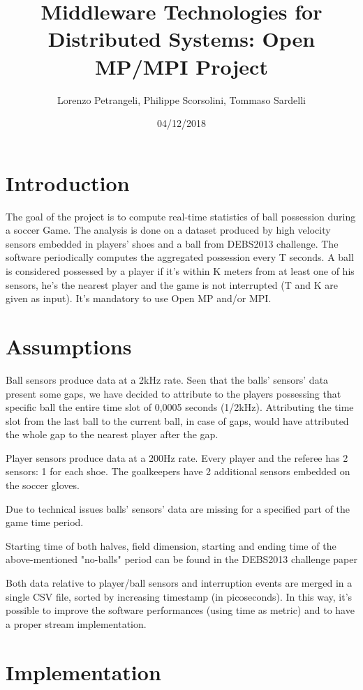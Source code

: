 \documentclass[a4paper]{article}
\title{Middleware Technologies for Distributed Systems: Open MP/MPI Project}
\author{Lorenzo Petrangeli, Philippe Scorsolini, Tommaso Sardelli}
\date{04/12/2018}
\begin{document}
\maketitle

\section{Introduction}

The goal of the project is to compute real-time statistics of ball possession during a soccer Game. The analysis is done on a dataset produced by high velocity sensors embedded in players' shoes and a ball from DEBS2013 challenge\cite{bardi2006calculus}. The software periodically computes the aggregated possession every T seconds. A ball is considered possessed by a player if it's within K meters from at least one of his sensors, he's the nearest player and the game is not interrupted (T and K are given as input). It's mandatory to use Open MP and/or MPI.

\section{Assumptions}

Ball sensors produce data at a 2kHz rate. Seen that the balls' sensors' data present some gaps, we have decided to attribute to the players possessing that specific ball the entire time slot of 0,0005 seconds (1/2kHz). Attributing the time slot from the last ball to the current ball, in case of gaps, would have attributed the whole gap to the nearest player after the gap. 

Player sensors produce data at a 200Hz rate. Every player and the referee has 2 sensors: 1 for each shoe. The goalkeepers have 2 additional sensors embedded on the soccer gloves. 

Due to technical issues balls' sensors' data are missing for a specified part of the game time period.

Starting time of both halves, field dimension, starting and ending time of the above-mentioned "no-balls" period can be found in the DEBS2013 challenge paper\cite{}

Both data relative to player/ball sensors and interruption events are merged in a single CSV file, sorted by increasing timestamp (in picoseconds). In this way, it's possible to improve the software performances (using time as metric) and to have a proper stream implementation.

\section{Implementation}
\end{document}
